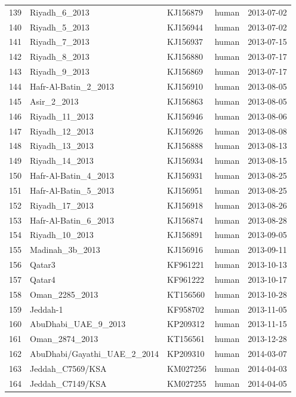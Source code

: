 \documentclass[11pt,oneside,letterpaper]{article}
\begin{document}
\begin{longtable}{ | l | l | l | l | l | }
  139 & Riyadh\_6\_2013 & KJ156879 & human & 2013-07-02 \\
  140 & Riyadh\_5\_2013 & KJ156944 & human & 2013-07-02 \\
  141 & Riyadh\_7\_2013 & KJ156937 & human & 2013-07-15 \\
  142 & Riyadh\_8\_2013 & KJ156880 & human & 2013-07-17 \\
  143 & Riyadh\_9\_2013 & KJ156869 & human & 2013-07-17 \\
  144 & Hafr-Al-Batin\_2\_2013 & KJ156910 & human & 2013-08-05 \\
  145 & Asir\_2\_2013 & KJ156863 & human & 2013-08-05 \\
  146 & Riyadh\_11\_2013 & KJ156946 & human & 2013-08-06 \\
  147 & Riyadh\_12\_2013 & KJ156926 & human & 2013-08-08 \\
  148 & Riyadh\_13\_2013 & KJ156888 & human & 2013-08-13 \\
  149 & Riyadh\_14\_2013 & KJ156934 & human & 2013-08-15 \\
  150 & Hafr-Al-Batin\_4\_2013 & KJ156931 & human & 2013-08-25 \\
  151 & Hafr-Al-Batin\_5\_2013 & KJ156951 & human & 2013-08-25 \\
  152 & Riyadh\_17\_2013 & KJ156918 & human & 2013-08-26 \\
  153 & Hafr-Al-Batin\_6\_2013 & KJ156874 & human & 2013-08-28 \\
  154 & Riyadh\_10\_2013 & KJ156891 & human & 2013-09-05 \\
  155 & Madinah\_3b\_2013 & KJ156916 & human & 2013-09-11 \\
  156 & Qatar3 & KF961221 & human & 2013-10-13 \\
  157 & Qatar4 & KF961222 & human & 2013-10-17 \\
  158 & Oman\_2285\_2013 & KT156560 & human & 2013-10-28 \\
  159 & Jeddah-1 & KF958702 & human & 2013-11-05 \\
  160 & AbuDhabi\_UAE\_9\_2013 & KP209312 & human & 2013-11-15 \\
  161 & Oman\_2874\_2013 & KT156561 & human & 2013-12-28 \\
  162 & AbuDhabi/Gayathi\_UAE\_2\_2014 & KP209310 & human & 2014-03-07 \\
  163 & Jeddah\_C7569/KSA & KM027256 & human & 2014-04-03 \\
  164 & Jeddah\_C7149/KSA & KM027255 & human & 2014-04-05 \\

\end{longtable}
\end{document}
